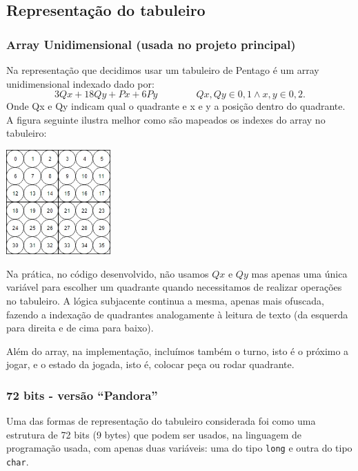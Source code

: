
\subsection{Representação do tabuleiro}

\subsubsection{Array Unidimensional (usada no projeto principal)}

Na representação que decidimos usar um tabuleiro de Pentago é um array unidimensional indexado dado por:
\begin{equation*}
3Qx+18Qy+Px+6Py	\qquad\qquad Qx,Qy\in{0,1} \land x,y\in{0,2}.
\end{equation*}
Onde Qx e Qy indicam qual o quadrante e x e y a posição dentro do quadrante. A figura seguinte ilustra melhor como são mapeados os indexes do array no tabuleiro:

\begin{table}[H]
\centering
\includegraphics[height=4cm]{images/boardindexes.jpg}
\end{table}

Na prática, no código desenvolvido, não usamos $Qx$ e $Qy$ mas apenas uma única variável para escolher um quadrante quando necessitamos de realizar operações no tabuleiro. A lógica subjacente continua a mesma, apenas mais ofuscada, fazendo a indexação de quadrantes analogamente à leitura de texto (da esquerda para direita e de cima para baixo).

Além do array, na implementação, incluímos também o turno, isto é o próximo a jogar, e o estado da jogada, isto é, colocar peça ou rodar quadrante.

\subsubsection{72 bits - versão ``Pandora''}

Uma das formas de representação do tabuleiro considerada foi como uma estrutura de 72 bits (9 bytes) que podem ser usados, na linguagem de programação usada, com apenas duas variáveis: uma do tipo \verb|long| e outra do tipo \verb|char|. 

